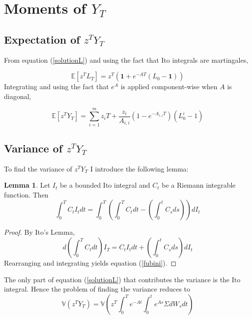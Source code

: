\documentclass[12pt]{article}
\theoremstyle{definition}
\newtheorem{lemma}{Lemma}
\begin{document}
\section{Moments of \(Y_T\)} \label{mY}

\subsection{Expectation of \(z^T Y_T\)}
From equation (\ref{solutionL}) and using the fact that Ito integrals are martingales, 

\begin{equation}
\mathbb{E}[z^T L_T]=z^T \left(\mathbf{1}+e^{-AT}(L_0-\mathbf{1})\right)
\end{equation}
Integrating and using the fact that \(e^A\) is applied component-wise when \(A\) is diagonal,

\begin{equation}
\mathbb{E}[z^T Y_T]=\sum_{i=1} ^ m z_i T+\frac{z_i}{A_{i,i}}\left(1-e^{-{A}_{i, i}T}\right)(L_0^ i-1)\end{equation}

\subsection{Variance of \(z^T Y_T\)}
To find the variance of \(z^T Y_T\) I introduce the following lemma:

\begin{lemma} \label{lemma1}
Let \(I_t\) be a bounded Ito integral  and \(C_t\) be a Riemann integrable function.  Then 
\begin{equation} \label{fubini} \int_ 0^ T  C_t I_t dt=  \int_ 0^ T \left(\int_0 ^ T C_t  dt-\left(\int_0 ^ t C_s ds\right)\right) dI_t
\end{equation}

\end{lemma}

\begin{proof}
By Ito's Lemma,
\begin{equation}
d\left(\int_0 ^ T C_t dt\right) I_T= C_t I_t dt +\left(\int_0 ^ t C_s ds\right) dI_t
\end{equation}
Rearranging and integrating yields equation (\ref{fubini}).
\end{proof}

The only part of equation (\ref{solutionL}) that contributes the variance is the Ito integral.  Hence the problem of finding the variance reduces to 
\begin{equation}
\mathbb{V}(z^T Y_T)=\mathbb{V}\left(z^T \int_0 ^ T e^{-At} \int_ 0 ^ t e^{As} \Sigma dW_s dt \right)
\end{equation}
\end{document}
